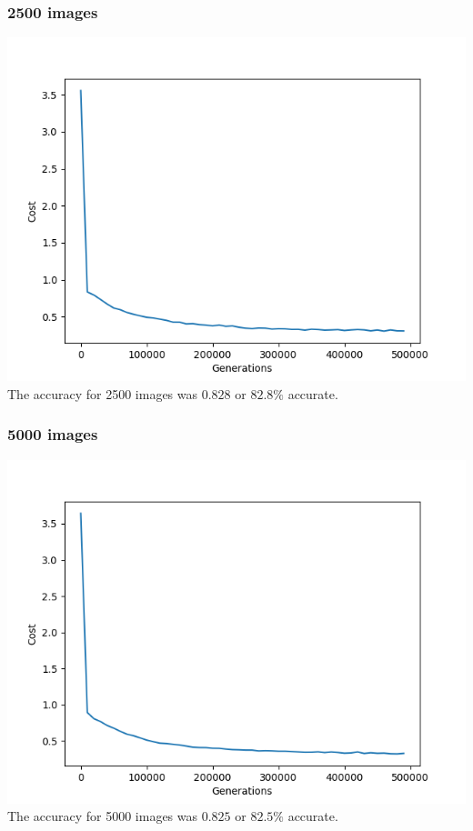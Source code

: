 \documentclass[12pt]{article}
\begin{document}
\subsubsection*{2500 images}
\includegraphics*[scale=0.7]{2500task1}\\
The accuracy for 2500 images was $0.828$ or $82.8 \%$ accurate.  

\subsubsection*{5000 images}
\includegraphics*[scale=0.7]{5ktask1}\\
The accuracy for 5000 images was $0.825$ or $82.5 \%$ accurate.    
\end{document}
